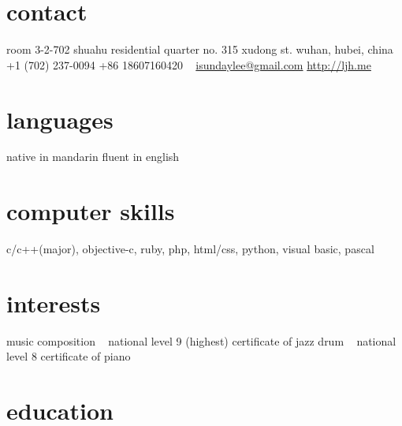 \documentclass[]{friggeri-cv} %
\begin{document}


\begin{aside} %
\section{contact}
room 3-2-702 shuahu residential quarter
no. 315 xudong st.
wuhan, hubei, china
~
+1 (702) 237-0094
+86 18607160420
~
\href{mailto:isundaylee@gmail.com}{isundaylee@gmail.com}
\href{http://ljh.me}{http://ljh.me}
~
\section{languages}
native in mandarin
fluent in english
~
\section{computer skills}
c/c++(major), objective-c, ruby, php, html/css, python, visual basic, pascal
~
\section{interests}
music composition
~
national level 9 (highest) certificate of jazz drum
~
national level 8 certificate of piano
\end{aside}


\section{education}
\end{document}
